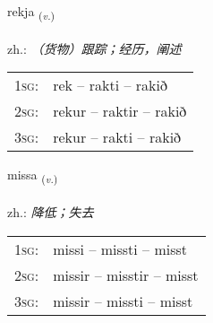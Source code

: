 \documentclass[frontgrid, backgrid]{flacards}\usepackage[]{graphicx}\usepackage[]{xcolor}
\begin{document}
\renewcommand{\flhead}{\vskip5pt \fboxsep=0pt {\small\bfseries\footnotesize Sagnorð | 动词}}
\renewcommand{\fcfoot}{\vskip5pt \fboxsep=0pt \hspace{2pt}{\small\bfseries\footnotesize 1K}}

\renewcommand{\blhead}{\vskip5pt {\small\bfseries\footnotesize Sagnorð | 动词 }}
\renewcommand{\bcfoot}{\vskip5pt \hspace{2pt}{\small\bfseries\footnotesize 1K}}


{rekja \small{\textsubscript{(\textit{v.})}} \\[1ex] %
\textphonetic{[rɛːca]} \\
zh.: \emph{（货物）跟踪；经历，阐述} \\  [2ex]
\renewcommand*{\arraystretch}{0.8}
\begin{tabular}{p{1cm}l}
\textsc{1sg}: & rek -- rakti -- rakið \\ 
\textsc{2sg}: & rekur -- raktir -- rakið \\ 
\textsc{3sg}: & rekur -- rakti -- rakið \\ 
\end{tabular}
}

\renewcommand{\flhead}{\vskip5pt \fboxsep=0pt {\small\bfseries\footnotesize Sagnorð | 动词}}
\renewcommand{\fcfoot}{\vskip5pt \fboxsep=0pt \hspace{2pt}{\small\bfseries\footnotesize 1K}}

\renewcommand{\blhead}{\vskip5pt {\small\bfseries\footnotesize Sagnorð | 动词 }}
\renewcommand{\bcfoot}{\vskip5pt \hspace{2pt}{\small\bfseries\footnotesize 1K}}


{missa \small{\textsubscript{(\textit{v.})}} \\[1ex] %
\textphonetic{[mɪsa]} \\
zh.: \emph{降低；失去} \\  [2ex]
\renewcommand*{\arraystretch}{0.8}
\begin{tabular}{p{1cm}l}
\textsc{1sg}: & missi -- missti -- misst \\ 
\textsc{2sg}: & missir -- misstir -- misst \\ 
\textsc{3sg}: & missir -- missti -- misst \\ 
\end{tabular}
}
\end{document}
